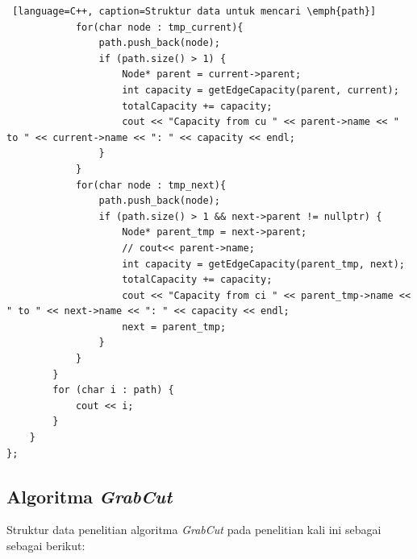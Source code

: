 \begin{lstlisting} [language=C++, caption=Struktur data untuk mencari \emph{path}]
            for(char node : tmp_current){
                path.push_back(node);
                if (path.size() > 1) {
                    Node* parent = current->parent;
                    int capacity = getEdgeCapacity(parent, current);
                    totalCapacity += capacity;
                    cout << "Capacity from cu " << parent->name << " to " << current->name << ": " << capacity << endl;
                }
            }
            for(char node : tmp_next){
                path.push_back(node);
                if (path.size() > 1 && next->parent != nullptr) {
                    Node* parent_tmp = next->parent;
                    // cout<< parent->name;
                    int capacity = getEdgeCapacity(parent_tmp, next);
                    totalCapacity += capacity;
                    cout << "Capacity from ci " << parent_tmp->name << " to " << next->name << ": " << capacity << endl;
                    next = parent_tmp;
                }
            }
        }
        for (char i : path) {
            cout << i;
        }
    }
};
\end{lstlisting}



\subsection{Algoritma \emph{GrabCut}}
Struktur data penelitian algoritma \emph{GrabCut} pada penelitian kali ini sebagai 
sebagai berikut: 

